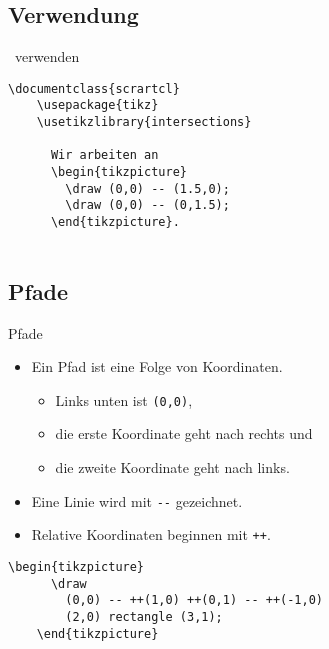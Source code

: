 \subsection{Verwendung}

\begin{Frame}[fragile]{\TikZ\ verwenden}

  \xxx

  \begin{lstlisting}[gobble=4]
    \documentclass{scrartcl}
    \usepackage{tikz}
    \usetikzlibrary{intersections}
    
      Wir arbeiten an
      \begin{tikzpicture}
        \draw (0,0) -- (1.5,0);
        \draw (0,0) -- (0,1.5);
      \end{tikzpicture}.
    
  \end{lstlisting}
\end{Frame}

\subsection{Pfade}

\begin{Frame}[fragile]{Pfade}
  \begin{itemize}
    \item Ein Pfad ist eine Folge von Koordinaten.
      \begin{itemize}
        \item Links unten ist \lstinline-(0,0)-,
        \item die erste Koordinate geht nach rechts und
        \item die zweite Koordinate geht nach links.
      \end{itemize}
    \item Eine Linie wird mit \lstinline|--| gezeichnet.
    \item Relative Koordinaten beginnen mit \lstinline-++-.
  \end{itemize}

  \xxx


  \xxx

  \begin{lstlisting}[gobble=4]
    \begin{tikzpicture}
      \draw
        (0,0) -- ++(1,0) ++(0,1) -- ++(-1,0)
        (2,0) rectangle (3,1);
    \end{tikzpicture}
  \end{lstlisting}
\end{Frame}


